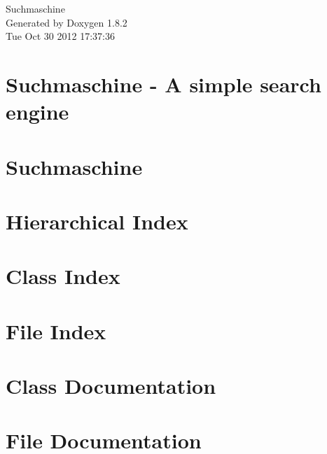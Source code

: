 \documentclass{book}
\begin{document}
\hypersetup{pageanchor=false,citecolor=blue}
\begin{titlepage}
\vspace*{7cm}
\begin{center}
{\Large Suchmaschine }\\
\vspace*{1cm}
{\large Generated by Doxygen 1.8.2}\\
\vspace*{0.5cm}
{\small Tue Oct 30 2012 17:37:36}\\
\end{center}
\end{titlepage}
\clearemptydoublepage
{}
\tableofcontents
\clearemptydoublepage
{}
\hypersetup{pageanchor=true,citecolor=blue}
\chapter{Suchmaschine -\/ A simple search engine}
\label{index}\hypertarget{index}{}
\chapter{Suchmaschine}
\label{md_README}
\hypertarget{md_README}{}

\chapter{Hierarchical Index}

\chapter{Class Index}

\chapter{File Index}

\chapter{Class Documentation}












\chapter{File Documentation}











\printindex
\end{document}
